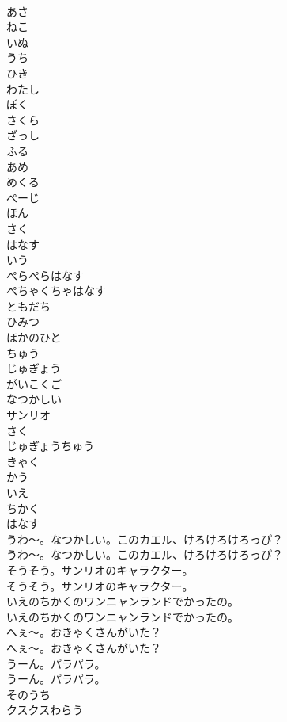 \documentclass[8pt]{extreport}
\begin{document}
\begin{CJK}{UTF8}{min}
\\	あさ
\\	ねこ
\\	いぬ
\\	うち
\\	ひき
\\	わたし
\\	ぼく
\\	さくら
\\	ざっし
\\	ふる
\\	あめ
\\	めくる
\\	ぺーじ
\\	ほん
\\	さく
\\	はなす
\\	いう
\\	ぺらぺらはなす
\\	ぺちゃくちゃはなす
\\	ともだち
\\	ひみつ
\\	ほかのひと
\\	ちゅう
\\	じゅぎょう
\\	がいこくご
\\	なつかしい
\\	サンリオ
\\	さく
\\	じゅぎょうちゅう
\\	きゃく
\\	かう
\\	いえ
\\	ちかく
\\	はなす
\\	うわ～。なつかしい。このカエル、けろけろけろっぴ？	
\\	うわ～。なつかしい。このカエル、けろけろけろっぴ？ 
\\	そうそう。サンリオのキャラクター。	
\\	そうそう。サンリオのキャラクター。 
\\	いえのちかくのワンニャンランドでかったの。	
\\	いえのちかくのワンニャンランドでかったの。 
\\	へぇ～。おきゃくさんがいた？	
\\	へぇ～。おきゃくさんがいた？ 
\\	うーん。パラパラ。	
\\	うーん。パラパラ。 
\\	そのうち
\\	クスクスわらう

\end{CJK}
\end{document}
